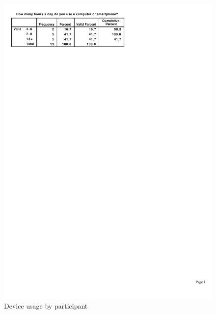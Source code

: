 \documentclass[a4paper, 12pt]{report}
\begin{document}
\begin{figure}[ht]
\centerline{\includegraphics{figures/ComputerHours.pdf}}
\caption{Device usage by participant}
\label{fig:partic_computerHours}
\end{figure}
\end{document}
